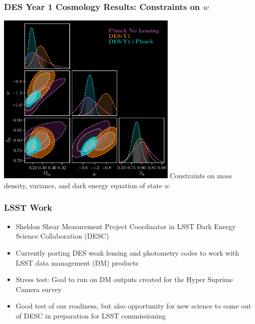 \documentclass{beamer}
\begin{document}
\frame
{
    \frametitle{DES Year 1 Cosmology Results: Constraints on $w$}


    \begin{center}
        \includegraphics[width=0.65\textwidth]{dpnl_w_inv.png}
        \newline
        Constraints on mass density, variance, and dark energy equation of state $w$
    \end{center}

}

\frame
{
    \frametitle{LSST Work}


    \begin{itemize}

         \item Sheldon {\color{gold} Shear Measurement Project Coordinator} in LSST Dark Energy Science Collaboration (DESC)

         \item Currently porting DES weak lensing and photometry codes to work with LSST data management (DM) products

         \item Stress test:  Goal to run on DM outputs created for the Hyper Suprime Camera survey

         \item Good test of our readiness, but also opportunity for new science
             to come out of DESC in preparation for LSST commissioning

    \end{itemize}



}
\end{document}
